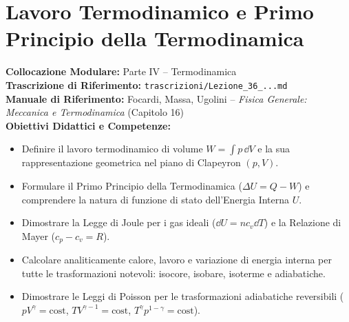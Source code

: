 \chapter{Lavoro Termodinamico e Primo Principio della Termodinamica}
\label{chap:primo_principio_trasformazioni}

\begin{tcolorbox}[enhanced, breakable, colback=navyblue!4!white, colframe=navyblue!80!black,
    coltitle=white, fonttitle=\bfseries\sffamily, title={Quadro Sinottico del Capitolo 14 (Corrispondenza: Lezione 36)},
    sharp corners, rounded corners=south, boxrule=1pt]
\textbf{Collocazione Modulare:} Parte IV -- Termodinamica\\
\textbf{Trascrizione di Riferimento:} \texttt{trascrizioni/Lezione\_36\_...md}\\
\textbf{Manuale di Riferimento:} Focardi, Massa, Ugolini -- \emph{Fisica Generale: Meccanica e Termodinamica} (Capitolo 16)\\
\textbf{Obiettivi Didattici e Competenze:}\par
\begin{itemize}
    \item Definire il lavoro termodinamico di volume $W = \int p\,\dd V$ e la sua rappresentazione geometrica nel piano di Clapeyron $(p, V)$.
    \item Formulare il Primo Principio della Termodinamica ($\Delta U = Q - W$) e comprendere la natura di funzione di stato dell'Energia Interna $U$.
    \item Dimostrare la Legge di Joule per i gas ideali ($\dd U = n c_v \dd T$) e la Relazione di Mayer ($c_p - c_v = R$).
    \item Calcolare analiticamente calore, lavoro e variazione di energia interna per tutte le trasformazioni notevoli: isocore, isobare, isoterme e adiabatiche.
    \item Dimostrare le Leggi di Poisson per le trasformazioni adiabatiche reversibili ($p V^\gamma = \text{cost}$, $T V^{\gamma-1} = \text{cost}$, $T^\gamma p^{1-\gamma} = \text{cost}$).
\end{itemize}
\end{tcolorbox}

\vspace{0.5em}

